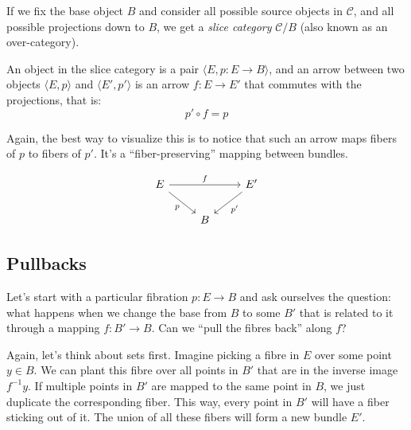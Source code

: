 \documentclass[DaoFP]{subfiles}
\begin{document}
If we fix the base object $B$ and consider all possible source objects in $\mathcal{C}$, and all possible projections down to $B$, we get a \emph{slice category} $\mathcal{C}/B$ (also known as an over-category). 

An object in the slice category is a pair $\langle E, p \colon E \to B \rangle$, and an arrow between two objects $\langle E, p \rangle$ and $\langle E', p' \rangle$ is an arrow $f \colon E \to E'$ that commutes with the projections, that is:
\[p' \circ f = p \]

Again, the best way to visualize this is to notice that such an arrow maps fibers of $p$ to fibers of $p'$. It's a ``fiber-preserving'' mapping between bundles.

\[
 \begin{tikzcd}
 E
 \arrow[rd, "p"']
 \arrow[rr, "f"]
 && E'
 \arrow[ld, "p'"]
 \\
 &B
  \end{tikzcd}
\]


\subsection{Pullbacks}

 Let's start with a particular fibration $p \colon E \to B$ and ask ourselves the question: what happens when we change the base from $B$ to some $B'$ that is related to it through a mapping $f \colon B' \to B$. Can we ``pull the fibres back'' along $f$? 
 
 Again, let's think about sets first. Imagine picking a fibre in $E$ over some point $y \in B$. We can plant this fibre over all points in $B'$ that are in the inverse image $f^{-1} y$. If multiple points in $B'$ are mapped to the same point in $B$, we just duplicate the corresponding fiber. This way, every point in $B'$ will have a fiber sticking out of it. The union of all these fibers will form a new bundle $E'$.
\end{document}
